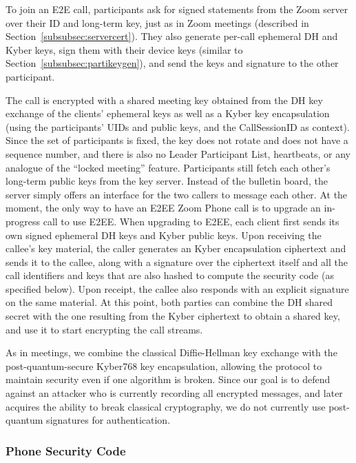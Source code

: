 To join an E2E call, participants ask for signed statements from the Zoom server over their ID and
long-term key, just as in Zoom meetings (described in Section~\ref{subsubsec:servercert}). They also
generate per-call ephemeral DH and Kyber keys, sign them with their device keys (similar to
Section~\ref{subsubsec:partikeygen}), and send the keys and signature to the other participant.

The call is encrypted with a shared meeting key obtained from the DH key exchange of the clients'
ephemeral keys as well as a Kyber key encapsulation (using the participants' UIDs and public keys, and the {\sf CallSessionID} as context). Since the set
of participants is fixed, the key does not rotate and does not have a sequence number, and there is
also no Leader Participant List, heartbeats, or any analogue of the ``locked meeting'' feature.
Participants still fetch each other's long-term public keys from the key server. Instead of the
bulletin board, the server simply offers an interface for the two callers to message each other. At
the moment, the only way to have an E2EE Zoom Phone call is to upgrade an in-progress call to use
E2EE. When upgrading to E2EE, each client first sends its own signed ephemeral DH keys and Kyber public keys. Upon receiving the callee's key material, the caller generates an Kyber encapsulation ciphertext and sends it to the callee, along with a signature over the ciphertext itself and all the call identifiers and keys that are also hashed to compute the security code (as specified below). Upon receipt, the callee also responds with an explicit signature on the same material. At this point, both parties can combine the DH shared secret with the one resulting from the Kyber ciphertext to obtain a shared key, and use it to start encrypting the call streams.

As in meetings, we combine the classical Diffie-Hellman key exchange with the post-quantum-secure Kyber768 key encapsulation, allowing the protocol to maintain security even if one algorithm is broken. Since our goal is to defend against an attacker who is currently recording all encrypted messages, and later acquires the ability to break classical cryptography, we do not currently use post-quantum signatures for authentication.

\subsubsection{Phone Security Code}

